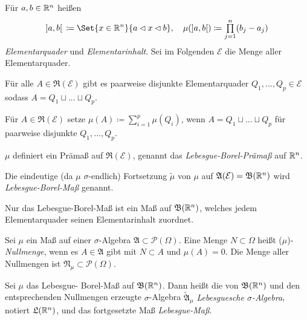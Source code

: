\documentclass{cheat-sheet}
\newcommand{\PS}{\mathcal{P}} %
\newcommand{\PSO}{\PS(\Omega)} %
\newcommand{\Alg}{\mathfrak{A}} %
\newcommand{\Ring}{\mathfrak{R}} %
\newcommand{\Bor}{\mathfrak{B}} %
\begin{document}
\begin{defn}
  Für $a, b \in \mathbb{R}^n$ heißen
  \[
    \left]a, b\right[\,\coloneqq \Set{ x \in \R^n }{ a \lhd x \lhd b }, \quad
    \mu(\left]a, b\right[) \coloneqq \prod_{j = 1}^{n} (b_j - a_j)
  \]
  \emph{Elementarquader} und \emph{Elementarinhalt}. Sei im Folgenden $\mathcal{E}$ die Menge aller Elementarquader.
\end{defn}

\begin{satz}
  Für alle $A \in \Ring(\mathcal{E})$ gibt es paarweise disjunkte Elementarquader $Q_1, ..., Q_p \in \mathcal{E}$ sodass $A = Q_1 \sqcup ... \sqcup Q_p$.
\end{satz}

\begin{defn}
  Für $A \in \Ring(\mathcal{E})$ setze $\mu(A) \coloneqq \textstyle\sum_{i = 1}^p \mu(Q_i)$, wenn $A = Q_1 \sqcup ... \sqcup Q_p$ für paarweise disjunkte $Q_1, ..., Q_p$.
\end{defn}

\begin{satz}
  $\mu$ definiert ein Prämaß auf $\Ring(\mathcal{E})$, genannt das \emph{Lebesgue-Borel-Prämaß} auf $\mathbb{R}^n$.
\end{satz}

\begin{defn}
  Die eindeutige (da $\mu$ $\sigma$-endlich) Fortsetzung $\tilde{\mu}$ von $\mu$ auf $\Alg(\mathcal{E}) = \Bor(\R^n)$ wird \emph{Lebesgue-Borel-Maß} genannt.
\end{defn}

\begin{bem}
  Nur das Lebesgue-Borel-Maß ist ein Maß auf $\Bor(\R^n)$, welches jedem Elementarquader seinen Elementarinhalt zuordnet.
\end{bem}

\begin{defn}
  Sei $\mu$ ein Maß auf einer $\sigma$-Algebra $\Alg \subset \PSO$. Eine Menge $N \subset \Omega$ heißt ($\mu$)-\emph{Nullmenge}, wenn es $A \in \Alg$ gibt mit $N \subset A$ und $\mu(A) = 0$. Die Menge aller Nullmengen ist $\mathfrak{N}_\mu \subset \PSO$.
\end{defn}

\begin{defn}
  Sei $\mu$ das Lebesgue- Borel-Maß auf $\Bor(\R^n)$. Dann heißt die von $\Bor(\R^n)$ und den ent\-sprech\-en\-den Nullmengen erzeugte $\sigma$-Algebra $\tilde{\Alg}_\mu$ \emph{Lebesguesche $\sigma$-Algebra}, notiert $\mathfrak{L}(\mathbb{R}^n)$, und das fortgesetzte Maß \emph{Lebesgue-Maß}.
\end{defn}
\end{document}
